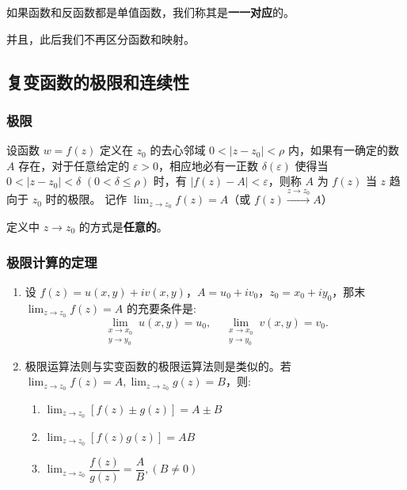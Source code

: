 \begin{tcolorbox}[title={Note},colback=red!5!white
,colframe=red!75!black
,colbacktitle=yellow!50!red
,coltitle=red!25!black, fonttitle=\bfseries,subtitle style={boxrule=0.4pt, colback=yellow!50!red!25!white}]
如果函数和反函数都是单值函数，我们称其是\textbf{一一对应}的。

并且，此后我们不再区分函数和映射。

\end{tcolorbox}
\subsection{复变函数的极限和连续性}
\label{复变函数的极限和连续性}
\subsubsection{极限}
\label{极限}
设函数 \(w=f(z)\) 定义在 \(z_0\) 的去心邻域 \(0 < |z - z_0| < \rho\)
内，如果有一确定的数 \(A\) 存在，对于任意给定的
\(\varepsilon > 0\)，相应地必有一正数 \(\delta(\varepsilon)\) 使得当
\(0 < |z - z_0| < \delta\) \((0 < \delta \leq \rho)\) 时，有
\(|f(z) - A| < \varepsilon\)，则称 \(A\) 为 \(f(z)\) 当 \(z\) 趋向于
\(z_0\) 时的极限。 记作 \(\lim_{z \to z_0} f(z) = A\)（或
\(f(z) \xrightarrow{z \to z_0} A\)）

\begin{tcolorbox}[title={Tips},colback=red!5!white
,colframe=red!75!black
,colbacktitle=yellow!50!red
,coltitle=red!25!black, fonttitle=\bfseries,subtitle style={boxrule=0.4pt, colback=yellow!50!red!25!white}]
定义中 \(z \to z_0\) 的方式是\textbf{任意的}。

\end{tcolorbox}
\subsubsection{极限计算的定理}
\label{极限计算的定理}
\begin{enumerate}
\item 设 \(f(z) = u(x, y) + i v(x, y)\)，\(A = u_0 + i v_0\)，\(z_0 =
   x_0 + i y_0\)，那末 \(\lim_{z \to z_0} f(z) = A\) 的充要条件是:
\begin{equation*}
\lim_{\substack{x \to x_0 \\
y \to y_0}} u(x, y) = u_0, \quad \lim_{\substack{x \to x_0
\\ y \to y_0}} v(x, y) = v_0.
\end{equation*}
\item 极限运算法则与实变函数的极限运算法则是类似的。若
\(\lim_{z \to z_0}f(z)=A, \lim_{z \to z_0}g(z)=B\)，则:
\begin{enumerate}
\item \(\lim_{z \to z_0}[f(z) \pm g(z)] = A \pm B\)
\item \(\lim_{z \to z_0}[f(z)g(z)]=AB\)
\item \(\lim_{z \to z_0}\dfrac{f(z)}{g(z)}=\dfrac{A}{B},(B \ne 0)\)
\end{enumerate}
\end{enumerate}
